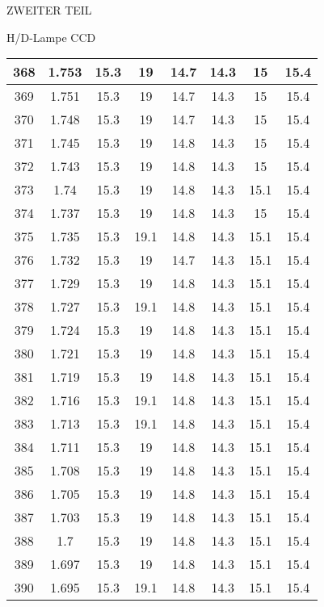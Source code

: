\begin{appendix}
\begin{chapter}{ZWEITER TEIL}
\begin{section}{H/D-Lampe CCD}
\begin{scriptsize}
\begin{longtable}[htbp]{|c|c|c|c|c|c|c|c|}
            368 & 1.753 & 15.3 & 19 & 14.7 & 14.3 & 15 & 15.4 \\ \hline
            369 & 1.751 & 15.3 & 19 & 14.7 & 14.3 & 15 & 15.4 \\ \hline
            370 & 1.748 & 15.3 & 19 & 14.7 & 14.3 & 15 & 15.4 \\ \hline
            371 & 1.745 & 15.3 & 19 & 14.8 & 14.3 & 15 & 15.4 \\ \hline
            372 & 1.743 & 15.3 & 19 & 14.8 & 14.3 & 15 & 15.4 \\ \hline
            373 & 1.74 & 15.3 & 19 & 14.8 & 14.3 & 15.1 & 15.4 \\ \hline
            374 & 1.737 & 15.3 & 19 & 14.8 & 14.3 & 15 & 15.4 \\ \hline
            375 & 1.735 & 15.3 & 19.1 & 14.8 & 14.3 & 15.1 & 15.4 \\ \hline
            376 & 1.732 & 15.3 & 19 & 14.7 & 14.3 & 15.1 & 15.4 \\ \hline
            377 & 1.729 & 15.3 & 19 & 14.8 & 14.3 & 15.1 & 15.4 \\ \hline
            378 & 1.727 & 15.3 & 19.1 & 14.8 & 14.3 & 15.1 & 15.4 \\ \hline
            379 & 1.724 & 15.3 & 19 & 14.8 & 14.3 & 15.1 & 15.4 \\ \hline
            380 & 1.721 & 15.3 & 19 & 14.8 & 14.3 & 15.1 & 15.4 \\ \hline
            381 & 1.719 & 15.3 & 19 & 14.8 & 14.3 & 15.1 & 15.4 \\ \hline
            382 & 1.716 & 15.3 & 19.1 & 14.8 & 14.3 & 15.1 & 15.4 \\ \hline
            383 & 1.713 & 15.3 & 19.1 & 14.8 & 14.3 & 15.1 & 15.4 \\ \hline
            384 & 1.711 & 15.3 & 19 & 14.8 & 14.3 & 15.1 & 15.4 \\ \hline
            385 & 1.708 & 15.3 & 19 & 14.8 & 14.3 & 15.1 & 15.4 \\ \hline
            386 & 1.705 & 15.3 & 19 & 14.8 & 14.3 & 15.1 & 15.4 \\ \hline
            387 & 1.703 & 15.3 & 19 & 14.8 & 14.3 & 15.1 & 15.4 \\ \hline
            388 & 1.7 & 15.3 & 19 & 14.8 & 14.3 & 15.1 & 15.4 \\ \hline
            389 & 1.697 & 15.3 & 19 & 14.8 & 14.3 & 15.1 & 15.4 \\ \hline
            390 & 1.695 & 15.3 & 19.1 & 14.8 & 14.3 & 15.1 & 15.4 \\ \hline

\end{longtable}
\end{scriptsize}
\end{section}
\end{chapter}
\end{appendix}
